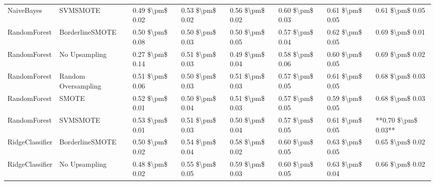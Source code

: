 \begin{tabular}{llllllll}
                     NaiveBayes &                      SVMSMOTE & 0.49 \$\textbackslash pm\$ 0.02 &           0.53 \$\textbackslash pm\$ 0.02 &       0.56 \$\textbackslash pm\$ 0.02 &        0.60 \$\textbackslash pm\$ 0.03 &                         0.61 \$\textbackslash pm\$ 0.05 &     0.61 \$\textbackslash pm\$ 0.05 \\
                   RandomForest &               BorderlineSMOTE & 0.50 \$\textbackslash pm\$ 0.08 &           0.50 \$\textbackslash pm\$ 0.03 &       0.50 \$\textbackslash pm\$ 0.05 &        0.57 \$\textbackslash pm\$ 0.04 &                         0.62 \$\textbackslash pm\$ 0.05 &     0.69 \$\textbackslash pm\$ 0.01 \\
                   RandomForest &                 No Upsampling & 0.27 \$\textbackslash pm\$ 0.14 &           0.51 \$\textbackslash pm\$ 0.03 &       0.49 \$\textbackslash pm\$ 0.04 &        0.58 \$\textbackslash pm\$ 0.06 &                         0.60 \$\textbackslash pm\$ 0.05 &     0.69 \$\textbackslash pm\$ 0.02 \\
                   RandomForest &           Random Oversampling & 0.51 \$\textbackslash pm\$ 0.06 &           0.50 \$\textbackslash pm\$ 0.03 &       0.51 \$\textbackslash pm\$ 0.03 &        0.57 \$\textbackslash pm\$ 0.05 &                         0.61 \$\textbackslash pm\$ 0.05 &     0.68 \$\textbackslash pm\$ 0.03 \\
                   RandomForest &                         SMOTE & 0.52 \$\textbackslash pm\$ 0.01 &           0.50 \$\textbackslash pm\$ 0.04 &       0.51 \$\textbackslash pm\$ 0.03 &        0.57 \$\textbackslash pm\$ 0.05 &                         0.59 \$\textbackslash pm\$ 0.05 &     0.68 \$\textbackslash pm\$ 0.03 \\
                   RandomForest &                      SVMSMOTE & 0.53 \$\textbackslash pm\$ 0.01 &           0.51 \$\textbackslash pm\$ 0.03 &       0.50 \$\textbackslash pm\$ 0.04 &        0.57 \$\textbackslash pm\$ 0.05 &                         0.61 \$\textbackslash pm\$ 0.05 & **0.70 \$\textbackslash pm\$ 0.03** \\
                RidgeClassifier &               BorderlineSMOTE & 0.50 \$\textbackslash pm\$ 0.02 &           0.54 \$\textbackslash pm\$ 0.04 &       0.58 \$\textbackslash pm\$ 0.02 &        0.60 \$\textbackslash pm\$ 0.05 &                         0.63 \$\textbackslash pm\$ 0.05 &     0.65 \$\textbackslash pm\$ 0.02 \\
                RidgeClassifier &                 No Upsampling & 0.48 \$\textbackslash pm\$ 0.02 &           0.55 \$\textbackslash pm\$ 0.05 &       0.59 \$\textbackslash pm\$ 0.03 &        0.60 \$\textbackslash pm\$ 0.05 &                         0.63 \$\textbackslash pm\$ 0.04 &     0.66 \$\textbackslash pm\$ 0.02 \\

\end{tabular}
